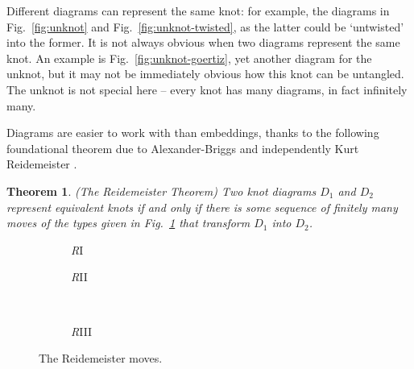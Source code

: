 \documentclass[12pt]{report}
\newtheorem*{theorem}{Theorem}
\begin{document}
Different diagrams can represent the same knot: for example, the diagrams in Fig.~\ref{fig:unknot} and Fig.~\ref{fig:unknot-twisted}, as the latter could be `untwisted' into the former. It is not always obvious when two diagrams represent the same knot. An example is Fig.~\ref{fig:unknot-goertiz}, yet another diagram for the unknot, but it may not be immediately obvious how this knot can be untangled. The unknot is not special here -- every knot has many diagrams, in fact infinitely many.

Diagrams are easier to work with than embeddings, thanks to the following foundational theorem due to Alexander-Briggs  \cite{types-of-knotted-curves} and independently Kurt Reidemeister \cite{elementary-justification-knot-theory}.
\begin{theorem}(The Reidemeister Theorem)
Two knot diagrams $D_{1}$ and $D_{2}$ represent equivalent knots if and only if there is some sequence of finitely many moves of the types given in Fig.~\ref{fig:reidemeister_moves} that transform $D_{1}$ into $D_{2}$.
\end{theorem}

\begin{figure}[hbt!]
	\centering
	\hspace*{\fill}
	\begin{subfigure}[b]{0.35 \textwidth}
		\centering
		\def\svgscale{0.22}
		
		\caption{\textit{R}I}
	\end{subfigure}
	\hspace*{\fill}
	\begin{subfigure}[b]{0.35 \textwidth}
		\centering
		\def\svgscale{0.22}
		
		\caption{\textit{R}II}
	\end{subfigure}
	\hspace*{\fill}
	\\
	\hspace*{\fill}
	\begin{subfigure}[b]{0.35 \textwidth}
		\centering
		\def\svgscale{0.22}
		
		\caption{\textit{R}III}
	\end{subfigure}
	\hspace*{\fill}
	\caption{The Reidemeister moves.}
	\label{fig:reidemeister_moves}
\end{figure}
\end{document}
